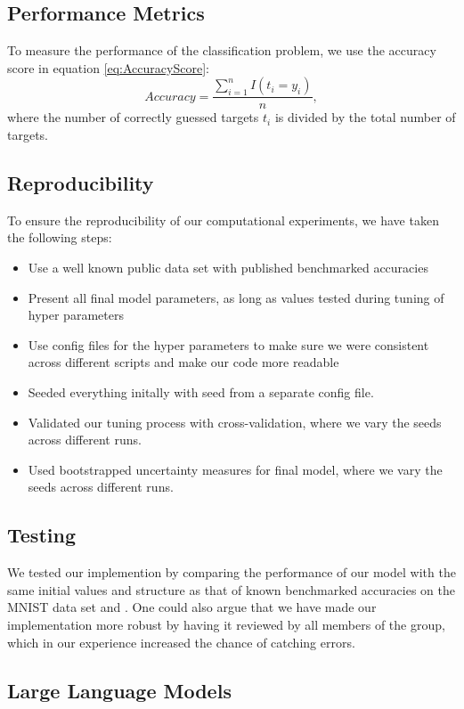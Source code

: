 \subsection{Performance Metrics}

To measure the performance of the classification problem, we use the accuracy score in equation \ref{eq:AccuracyScore}: \begin{equation}
    Accuracy = \frac{\sum_{i=1}^n I(t_i = y_i)}{n},
    \label{eq:AccuracyScore}
\end{equation}
where the number of correctly guessed targets $t_i$ is divided by the total number of targets.

\subsection{Reproducibility}
To ensure the reproducibility of our computational experiments, we have taken the following steps:
\begin{itemize}
    \item Use a well known public data set with published benchmarked accuracies
    \item Present all final model parameters, as long as values tested during tuning of hyper parameters
    \item Use config files for the hyper parameters to make sure we were consistent across different scripts and make our code more readable
    \item Seeded everything initally with seed from a separate config file.
    \item Validated our tuning process with cross-validation, where we vary the seeds across different runs. 
    \item Used bootstrapped uncertainty measures for final model, where we vary the seeds across different runs. 
\end{itemize}

\subsection{Testing}
We tested our implemention by comparing the performance of our model with the same initial values and structure as that of known benchmarked accuracies on the MNIST data set \cite{raschka2022machine} and \cite{lecun2015deep}. One could also argue that we have made our implementation more robust by having it reviewed by all members of the group, which in our experience increased the chance of catching errors. 
\subsection{Large Language Models}

